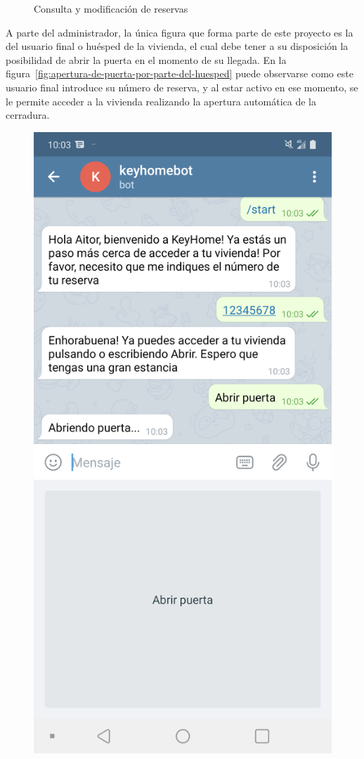 \begin{figure}[tbp]
\caption{Consulta y modificación de reservas}
\label{fig:consulta-y-moficicacion-de-reservas}
\end{figure}

A parte del administrador, la única figura que forma parte de este proyecto es la del usuario final o huésped de la vivienda, el cual debe tener a su disposición la posibilidad de abrir la puerta en el momento de su llegada. En la figura~\ref{fig:apertura-de-puerta-por-parte-del-huesped} puede observarse como este usuario final introduce su número de reserva, y al estar activo en ese momento, se le permite acceder a la vivienda realizando la apertura automática de la cerradura.

\begin{figure}[tbp]
\centering
\includegraphics[scale=0.15]{fig/Apertura-de-puerta-por-parte-del-huesped.png}

\end{figure}
